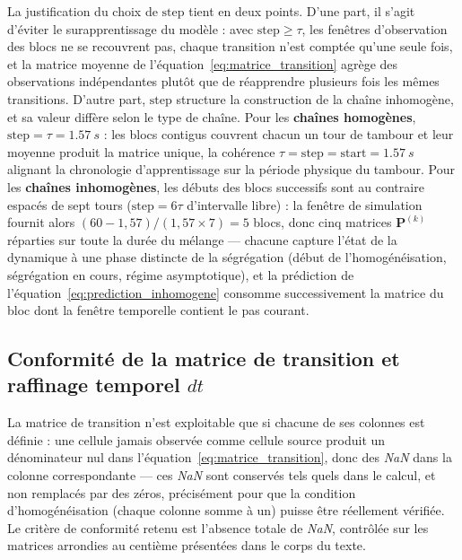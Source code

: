 \documentclass[french]{MemoireMaster}
\begin{document}
La justification du choix de $\mathrm{step}$ tient en deux points. D'une part, il s'agit d'éviter le surapprentissage du modèle : avec $\mathrm{step} \geq \tau$, les fenêtres d'observation des blocs ne se recouvrent pas, chaque transition n'est comptée qu'une seule fois, et la matrice moyenne de l'équation~\eqref{eq:matrice_transition} agrège des observations indépendantes plutôt que de réapprendre plusieurs fois les mêmes transitions. D'autre part, $\mathrm{step}$ structure la construction de la chaîne inhomogène, et sa valeur diffère selon le type de chaîne. Pour les \textbf{chaînes homogènes}, $\mathrm{step} = \tau = \SI{1.57}{s}$ : les blocs contigus couvrent chacun un tour de tambour et leur moyenne produit la matrice unique, la cohérence $\tau = \mathrm{step} = \mathrm{start} = \SI{1.57}{s}$ alignant la chronologie d'apprentissage sur la période physique du tambour. Pour les \textbf{chaînes inhomogènes}, les débuts des blocs successifs sont au contraire espacés de sept tours ($\mathrm{step} = 6\tau$ d'intervalle libre) : la fenêtre de simulation fournit alors $(60 - 1{,}57)/(1{,}57 \times 7) = 5$ blocs, donc cinq matrices $\mathbf{P}^{(k)}$ réparties sur toute la durée du mélange --- chacune capture l'état de la dynamique à une phase distincte de la ségrégation (début de l'homogénéisation, ségrégation en cours, régime asymptotique), et la prédiction de l'équation~\eqref{eq:prediction_inhomogene} consomme successivement la matrice du bloc dont la fenêtre temporelle contient le pas courant.

\subsection{Conformité de la matrice de transition et raffinage temporel \texorpdfstring{$dt$}{dt}}
\label{annexe:dt}

La matrice de transition n'est exploitable que si chacune de ses colonnes est définie : une cellule jamais observée comme cellule source produit un dénominateur nul dans l'équation~\eqref{eq:matrice_transition}, donc des \textit{NaN} dans la colonne correspondante --- ces \textit{NaN} sont conservés tels quels dans le calcul, et non remplacés par des zéros, précisément pour que la condition d'homogénéisation (chaque colonne somme à un) puisse être réellement vérifiée. Le critère de conformité retenu est l'absence totale de \textit{NaN}, contrôlée sur les matrices arrondies au centième présentées dans le corps du texte.
\end{document}

